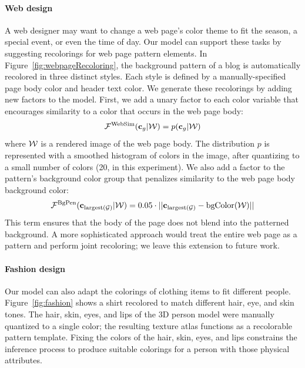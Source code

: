 \paragraph{Web design}
A web designer may want to change a web page's color theme to fit the season, a special event, or even the time of day. Our model can support these tasks by suggesting recolorings for web page pattern elements. In Figure~\ref{fig:webpageRecoloring}, the background pattern of a blog is automatically recolored in three distinct styles. Each style is defined by a manually-specified page body color and header text color. We generate these recolorings by adding new factors to the model. First, we add a unary factor to each color variable that encourages similarity to a color that occurs in the web page body:
\begin{equation*}
\mathcal{F}^\textrm{WebSim}(\mathbf{c}_g | \mathcal{W}) = p(\mathbf{c}_g | \mathcal{W})
\end{equation*}
where $\mathcal{W}$ is a rendered image of the web page body. The distribution $p$ is represented with a smoothed histogram of colors in the image, after quantizing to a small number of colors (20, in this experiment).
We also add a factor to the pattern's background color group that penalizes similarity to the web page body background color:
\begin{equation*}
\mathcal{F}^\textrm{BgPen}(\mathbf{c}_{\textrm{largest}(\mathcal{G})} | \mathcal{W}) = 0.05 \cdot || \mathbf{c}_{\textrm{largest}(\mathcal{G})} - \textrm{bgColor}(\mathcal{W}) ||
\end{equation*}
This term ensures that the body of the page does not blend into the patterned background. A more sophisticated approach would treat the entire web page as a pattern and perform joint recoloring; we leave this extension to future work.




\paragraph{Fashion design}
Our model can also adapt the colorings of clothing items to fit different people. Figure~\ref{fig:fashion} shows a shirt recolored to match different hair, eye, and skin tones. The hair, skin, eyes, and lips of the 3D person model were manually quantized to a single color; the resulting texture atlas functions as a recolorable pattern template. Fixing the colors of the hair, skin, eyes, and lips constrains the inference process to produce suitable colorings for a person with those physical attributes.

